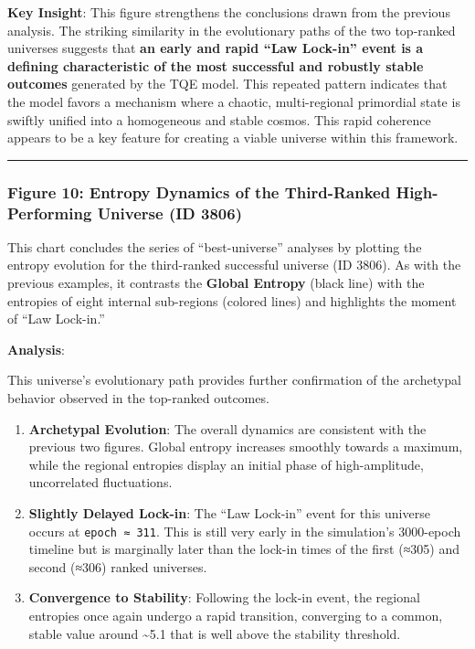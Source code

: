 \textbf{Key Insight}: This figure strengthens the conclusions drawn from
the previous analysis. The striking similarity in the evolutionary paths
of the two top-ranked universes suggests that \textbf{an early and rapid
``Law Lock-in'' event is a defining characteristic of the most
successful and robustly stable outcomes} generated by the TQE model.
This repeated pattern indicates that the model favors a mechanism where
a chaotic, multi-regional primordial state is swiftly unified into a
homogeneous and stable cosmos. This rapid coherence appears to be a key
feature for creating a viable universe within this framework.

\begin{center}\rule{0.5\linewidth}{0.5pt}\end{center}

\subsubsection{Figure 10: Entropy Dynamics of the Third-Ranked
High-Performing Universe (ID
3806)}\label{figure-10-entropy-dynamics-of-the-third-ranked-high-performing-universe-id-3806}

This chart concludes the series of ``best-universe'' analyses by
plotting the entropy evolution for the third-ranked successful universe
(ID 3806). As with the previous examples, it contrasts the
\textbf{Global Entropy} (black line) with the entropies of eight
internal sub-regions (colored lines) and highlights the moment of ``Law
Lock-in.''

\textbf{Analysis}:

This universe's evolutionary path provides further confirmation of the
archetypal behavior observed in the top-ranked outcomes.

\begin{enumerate}
\def\labelenumi{\arabic{enumi}.}
\item
  \textbf{Archetypal Evolution}: The overall dynamics are consistent
  with the previous two figures. Global entropy increases smoothly
  towards a maximum, while the regional entropies display an initial
  phase of high-amplitude, uncorrelated fluctuations.
\item
  \textbf{Slightly Delayed Lock-in}: The ``Law Lock-in'' event for this
  universe occurs at \texttt{epoch\ ≈\ 311}. This is still very early in
  the simulation's 3000-epoch timeline but is marginally later than the
  lock-in times of the first (≈305) and second (≈306) ranked universes.
\item
  \textbf{Convergence to Stability}: Following the lock-in event, the
  regional entropies once again undergo a rapid transition, converging
  to a common, stable value around \textasciitilde5.1 that is well above
  the stability threshold.
\end{enumerate}

